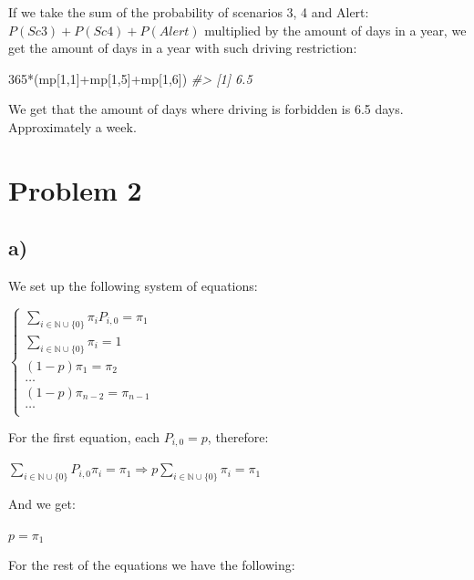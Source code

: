\documentclass[
]{article}
\newenvironment{Shaded}{\begin{snugshade}}{\end{snugshade}}
\newcommand{\CommentTok}[1]{\textcolor[rgb]{0.56,0.35,0.01}{\textit{#1}}}
\newcommand{\DecValTok}[1]{\textcolor[rgb]{0.00,0.00,0.81}{#1}}
\newcommand{\NormalTok}[1]{#1}
\newcommand{\SpecialCharTok}[1]{\textcolor[rgb]{0.00,0.00,0.00}{#1}}
\begin{document}
If we take the sum of the probability of scenarios 3, 4 and Alert:
\(P(Sc3) + P(Sc4) + P(Alert)\) multiplied by the amount of days in a
year, we get the amount of days in a year with such driving restriction:

\begin{Shaded}
\begin{Highlighting}[]
\DecValTok{365}\SpecialCharTok{*}\NormalTok{(mp[}\DecValTok{1}\NormalTok{,}\DecValTok{1}\NormalTok{]}\SpecialCharTok{+}\NormalTok{mp[}\DecValTok{1}\NormalTok{,}\DecValTok{5}\NormalTok{]}\SpecialCharTok{+}\NormalTok{mp[}\DecValTok{1}\NormalTok{,}\DecValTok{6}\NormalTok{])}
\CommentTok{\#\textgreater{} [1] 6.5}
\end{Highlighting}
\end{Shaded}

We get that the amount of days where driving is forbidden is 6.5 days.
Approximately a week.

\newpage

\hypertarget{problem-2}{%
\section{Problem 2}\label{problem-2}}

\hypertarget{a-1}{%
\subsection{a)}\label{a-1}}

We set up the following system of equations:

\(\begin{cases} \sum_{i \in \mathbb{N} \cup \{0\}} \pi_{i} P_{i,0} = \pi_{1} \\ \sum_{i \in \mathbb{N} \cup \{0\}} \pi_{i} = 1 \\ (1 - p) \pi_{1} = \pi_{2} \\ \dots \\ (1 - p) \pi_{n-2} = \pi_{n-1} \\ \dots \\ \end{cases}\)

For the first equation, each \(P_{i,0} = p\), therefore:

\(\sum_{i \in \mathbb{N} \cup \{0\}} P_{i,0} \pi_{i} = \pi_{1} \Rightarrow p \sum_{i \in \mathbb{N} \cup \{0\}} \pi_{i} = \pi_{1}\)

And we get:

\(p = \pi_{1}\)

For the rest of the equations we have the following:
\end{document}

